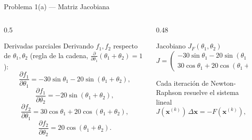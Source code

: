 \documentclass[aspectratio=169,10pt]{beamer}
\begin{document}
\begin{frame}{Problema 1(a) — Matriz Jacobiana}
\begin{columns}[T]
\begin{column}{0.5\textwidth}
\begin{cardgear}{Derivadas parciales}{\faCogs}
{\footnotesize
Derivando $f_1,f_2$ respecto de $\theta_1,\theta_2$ (regla de la cadena, $\tfrac{\partial}{\partial\theta_1}(\theta_1{+}\theta_2)=1$):
\[
\frac{\partial f_1}{\partial\theta_1}=-30\sin\theta_1-20\sin(\theta_1+\theta_2),
\]
\[
\frac{\partial f_1}{\partial\theta_2}=-20\sin(\theta_1+\theta_2),
\]
\[
\frac{\partial f_2}{\partial\theta_1}=30\cos\theta_1+20\cos(\theta_1+\theta_2),
\]
\[
\frac{\partial f_2}{\partial\theta_2}=20\cos(\theta_1+\theta_2).
\]}
\end{cardgear}
\end{column}
\begin{column}{0.48\textwidth}
\begin{cardidea}{Jacobiano $J_F(\theta_1,\theta_2)$}{\faSuperscript}
{\scriptsize
\[
J=\begin{pmatrix}
-30\sin\theta_1-20\sin(\theta_1{+}\theta_2) & -20\sin(\theta_1{+}\theta_2)\\[2mm]
30\cos\theta_1+20\cos(\theta_1{+}\theta_2) & 20\cos(\theta_1{+}\theta_2)
\end{pmatrix}
\]}
\end{cardidea}
\vspace{1mm}
\begin{cardnota}[\faInfoCircle]
{\footnotesize Cada iteración de Newton-Raphson resuelve el sistema lineal
\[
J(\mathbf x^{(k)})\,\Delta\mathbf x=-F(\mathbf x^{(k)}),\qquad
\mathbf x^{(k+1)}=\mathbf x^{(k)}+\Delta\mathbf x.
\]}
\end{cardnota}
\end{column}
\end{columns}
\end{frame}
\end{document}
